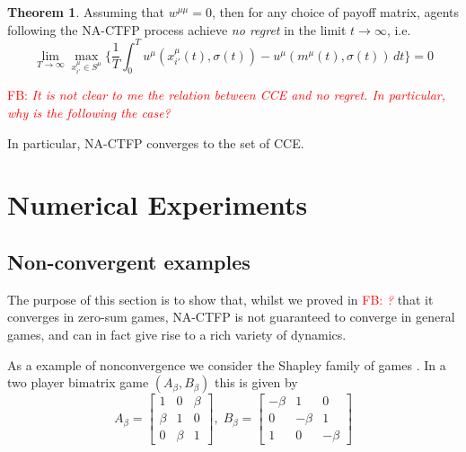 \documentclass{article}
\theoremstyle{definition}
\newtheorem{theorem}{Theorem}
\newcommand{\fb}[1]{\textcolor{red}{FB: \textit{#1}}}
\begin{document}
  \begin{theorem}
    Assuming that $w^{\mu \mu} = 0$, then for any choice of payoff matrix, agents following the
    NA-CTFP process achieve \emph{no regret} in the limit $t \rightarrow \infty$, i.e.
    \begin{equation}
      \lim_{T \rightarrow \infty} \max_{x_{i'}^\mu \in S^\mu} \Big\{ \frac{1}{T} \int_{0}^{T} u^{\mu}(x_{i'}^\mu(t), \sigma(t)) - u^{\mu}(m^\mu(t), \sigma(t)) \, dt \Big\} = 0
    \end{equation}

    \fb{It is not clear to me the relation between CCE and no regret. In particular, why is the following the case?}

    In particular, NA-CTFP converges to the set of CCE.

  \end{theorem}
  

\section{Numerical Experiments}

  \subsection{Non-convergent examples} \label{sec::NonConv}

  The purpose of this section is to show that, whilst we proved in \fb{?}
  that it converges in zero-sum games, NA-CTFP is not guaranteed to
  converge in general games, and can in fact give rise to a rich
  variety of dynamics.

  
  
  As a example of nonconvergence we consider the Shapley family of games \cite{Shapley2016}. In a two player bimatrix game $(A_\beta, B_\beta)$ this is given by
%
  \begin{equation}
    A_\beta = \begin{bmatrix}
      1 & 0 & \beta \\
      \beta & 1 & 0 \\
      0 & \beta & 1
    \end{bmatrix}, \; B_\beta =  \begin{bmatrix}
      - \beta & 1 & 0 \\
      0 & -\beta & 1 \\
      1 & 0 & -\beta
    \end{bmatrix}
  \end{equation}
\end{document}
